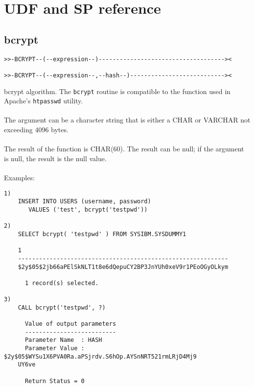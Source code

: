 \section{UDF and SP reference} \label{rtnreference}
\hypertarget{hbcrypt}{}
\subsection{bcrypt} \label{bcrypt1}
\begin{verbatim}
>>-BCRYPT--(--expression--)------------------------------------><

>>-BCRYPT--(--expression--,--hash--)---------------------------><
\end{verbatim}
bcrypt algorithm. The {\tt bcrypt} routine is compatible to the function used in Apache's {\tt htpasswd} utility.\\
\\
The argument can be a character string that is either a \mbox{CHAR} or \mbox{VARCHAR} not exceeding 4096 bytes.\\
\\
The result of the function is CHAR(60). The result can be null; if the argument is null, the result is the null value.\\
\\
Examples:
\begin{verbatim}
1)
    INSERT INTO USERS (username, password)
       VALUES ('test', bcrypt('testpwd'))

2)
    SELECT bcrypt( 'testpwd' ) FROM SYSIBM.SYSDUMMY1

    1
    ------------------------------------------------------------
    $2y$05$2jb66aPElSkNLT1t8e6dQepuCY2BP3JnYUh0xeV9r1PEoOGyOLkym

      1 record(s) selected.

3)
    CALL bcrypt('testpwd', ?)

      Value of output parameters
      --------------------------
      Parameter Name  : HASH
      Parameter Value : $2y$05$WYSu1X6PVA0Ra.aPSjrdv.S6hOp.AYSnNRT521rmLRjD4Mj9
    UY6ve

      Return Status = 0
\end{verbatim}
\newpage
\hypertarget{hsha256hex}{}
